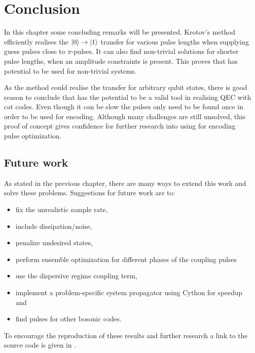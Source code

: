 \documentclass[main.tex]{subfiles}
\begin{document}
\chapter{Conclusion}
In this chapter some concluding remarks will be presented.
Krotov's method efficiently realises the \(\ket{0}\rightarrow\ket{1}\) transfer for various pulse lengths when supplying guess pulses close to \(\pi\)-pulses.
It can also find non-trivial solutions for shorter pulse lengths, when an amplitude constraints is present.
This proves that \krotov{} has potential to be used for non-trivial systems.

As the method could realise the transfer for arbitrary qubit states, there is good reason to conclude that \krotov{} has the potential to be a valid tool in realising QEC with cat codes.
Even though it can be slow the pulses only need to be found once in order to be used for encoding.
Although many challenges are still unsolved, this proof of concept gives confidence for further research into using \krotov{} for encoding pulse optimization.

\section{Future work}
\label{sec:future-work}
As stated in the previous chapter, there are many ways to extend this work and solve these problems.
Suggestions for future work are to:
\begin{itemize}
    \item fix the unrealistic sample rate,
    \item include dissipation/noise,
    \item penalize undesired states,
    \item perform ensemble optimization for different phases of the coupling pulses
    \item use the dispersive regime coupling term,
    \item implement a problem-specific system propagator using Cython for speedup and
    \item find pulses for other bosonic codes.
\end{itemize}
To encourage the reproduction of these results and further research a link to the source code is given in .
\end{document}
